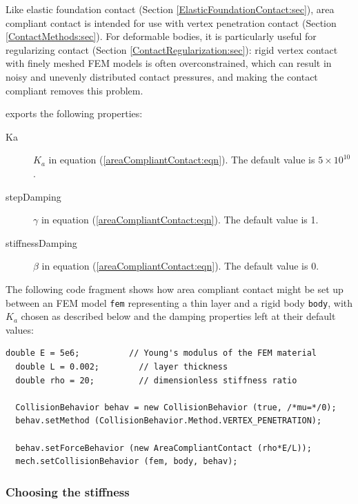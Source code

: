 Like elastic foundation contact (Section \ref{ElasticFoundationContact:sec}),
area compliant contact is intended for use with vertex penetration contact
(Section \ref{ContactMethods:sec}). For deformable bodies, it is particularly
useful for regularizing contact (Section
\ref{ContactRegularization:sec}): rigid vertex contact with finely
meshed FEM models is often overconstrained, which can result in
noisy and unevenly distributed contact pressures, and making the contact
compliant removes this problem.

 exports
the following properties:

\begin{description}

\item[Ka]\mbox{}

$K_a$ in equation (\ref{areaCompliantContact:eqn}). The default value
is $5 \times 10^{10}$.

\item[stepDamping]\mbox{}

$\gamma$ in equation (\ref{areaCompliantContact:eqn}). The default value
is 1.

\item[stiffnessDamping]\mbox{}

$\beta$ in equation (\ref{areaCompliantContact:eqn}). The default value
is 0.

\end{description}

The following code fragment shows how area compliant contact might be
set up between an FEM model {\tt fem} representing a thin layer and a
rigid body {\tt body}, with $K_a$ chosen as described below and the
damping properties left at their default values:
%
\begin{lstlisting}[]
  double E = 5e6;          // Young's modulus of the FEM material
  double L = 0.002;        // layer thickness
  double rho = 20;         // dimensionless stiffness ratio

  CollisionBehavior behav = new CollisionBehavior (true, /*mu=*/0);
  behav.setMethod (CollisionBehavior.Method.VERTEX_PENETRATION);

  behav.setForceBehavior (new AreaCompliantContact (rho*E/L));
  mech.setCollisionBehavior (fem, body, behav);
\end{lstlisting}
%

\subsubsection{Choosing the stiffness}
\label{AreaCompliantContactStiffness:sec}


